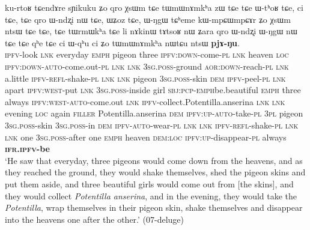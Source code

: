 \begin{exe}
\ex \label{ex:chain.pjANu}
\gll ku-rtoʁ tɕendɤre sɲikuku ʑo qro χsɯm  tɕe tɯmɯnɤmkʰa zɯ  tɕe  tɕe ɯ-tʰoʁ  tɕe, ci  tɕe, tɕe qro ɯ-ndʐi nɯ  tɕe, ɯʑoz  tɕe, ɯ-ŋgɯ tɕʰeme kɯ-mpɕɯ\redp{}mpɕɤr ʑo χsɯm ntsɯ  tɕe  tɕe, tɕe tɯrmɯkʰa tɕe li nɤkinɯ tɤtsoʁ nɯ  ʑara qro ɯ-ndʐi ɯ-ŋgɯ nɯ  tɕe tɕe  qʰe tɕe ci ɯ-qʰu ci ʑo tɯmɯnɤmkʰa nɯtɕu  ntsɯ \textbf{pjɤ-ŋu}. \\
\textsc{ipfv}-look \textsc{lnk} everyday \textsc{emph} pigeon three \textsc{ipfv}:\textsc{down}-come-\textsc{pl} \textsc{lnk} heaven \textsc{loc} \textsc{ipfv}:\textsc{down}-\textsc{auto}-come.out-\textsc{pl} \textsc{lnk} \textsc{lnk}  \textsc{3sg}.\textsc{poss}-ground \textsc{aor}:\textsc{down}-reach-\textsc{pl} \textsc{lnk} a.little \textsc{ipfv}-\textsc{refl}-shake-\textsc{pl} \textsc{lnk} \textsc{lnk} pigeon \textsc{3sg}.\textsc{poss}-skin \textsc{dem} \textsc{ipfv}-peel-\textsc{pl} \textsc{lnk} apart \textsc{ipfv}:\textsc{west}-put \textsc{lnk} \textsc{3sg}.\textsc{poss}-inside girl \textsc{sbj}:\textsc{pcp}-\textsc{emph}\redp{}be.beautiful \textsc{emph} three always \textsc{ipfv}:\textsc{west}-\textsc{auto}-come.out \textsc{lnk} \textsc{ipfv}-collect.Potentilla.anserina \textsc{lnk} \textsc{lnk} evening \textsc{loc} again \textsc{filler} Potentilla.anserina \textsc{dem} \textsc{ipfv}:\textsc{up}-\textsc{auto}-take-\textsc{pl} \textsc{3pl} pigeon \textsc{3sg}.\textsc{poss}-skin \textsc{3sg}.\textsc{poss}-in \textsc{dem} \textsc{ipfv}-\textsc{auto}-wear-\textsc{pl} \textsc{lnk} \textsc{lnk}  \textsc{ipfv}-\textsc{refl}-shake-\textsc{pl} \textsc{lnk} \textsc{lnk} one \textsc{3sg}.\textsc{poss}-after one \textsc{emph} heaven \textsc{dem}:\textsc{loc} \textsc{ipfv}:\textsc{up}-disappear-\textsc{pl} always \textbf{\textsc{ifr}.\textsc{ipfv}-be}  \\
\glt `He saw that everyday, three pigeons would come down from the heavens, and as they reached the ground, they would shake themselves, shed the pigeon skins and put them aside, and three beautiful girls would come out from [the skins], and they would collect \textit{Potentilla anserina}, and in the evening, they would take the \textit{Potentilla}, wrap themselves in their pigeon skin, shake themselves and disappear into the heavens one after the other.' (07-deluge)
\end{exe}


